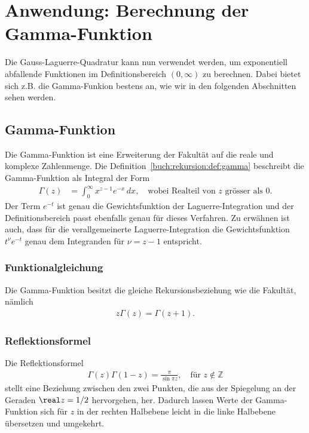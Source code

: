 %
%
%
\section{Anwendung: Berechnung der Gamma-Funktion
  \label{laguerre:section:quad-gamma}}
Die Gauss-Laguerre-Quadratur kann nun verwendet werden,
um exponentiell abfallende Funktionen im Definitionsbereich $(0, \infty)$ zu
berechnen.
Dabei bietet sich z.B. die Gamma-Funkion bestens an, wie wir in den folgenden
Abschnitten sehen werden.

\subsection{Gamma-Funktion}
Die Gamma-Funktion ist eine Erweiterung der Fakultät auf die reale und komplexe
Zahlenmenge.
Die Definition~\ref{buch:rekursion:def:gamma} beschreibt die Gamma-Funktion als
Integral der Form
\begin{align}
\Gamma(z)
 & =
\int_0^\infty x^{z-1} e^{-x} \, dx
,
\quad
\text{wobei Realteil von $z$ grösser als $0$}
\label{laguerre:gamma}
.
\end{align}
Der Term $e^{-t}$ ist genau die Gewichtsfunktion der Laguerre-Integration und
der Definitionsbereich passt ebenfalls genau für dieses Verfahren.
Zu erwähnen ist auch, dass für die verallgemeinerte Laguerre-Integration die
Gewichtsfunktion $t^\nu e^{-t}$ genau dem Integranden für $\nu=z-1$ entspricht.

\subsubsection{Funktionalgleichung}
Die Gamma-Funktion besitzt die gleiche Rekursionsbeziehung wie die Fakultät,
nämlich
\begin{align}
z \Gamma(z)
=
\Gamma(z+1)
.
\label{laguerre:gamma_funktional}
\end{align}

\subsubsection{Reflektionsformel}
Die Reflektionsformel
\begin{align}
\Gamma(z) \Gamma(1 - z)
=
\frac{\pi}{\sin \pi z}
,\quad
\text{für }
z \notin \mathbb{Z}
\label{laguerre:gamma_refform}
\end{align}
stellt eine Beziehung zwischen den zwei Punkten,
die aus der Spiegelung an der Geraden $\real z = 1/2$ hervorgehen,
her.
Dadurch lassen Werte der Gamma-Funktion sich für $z$ in der rechten Halbebene
leicht in die linke Halbebene übersetzen und umgekehrt.

